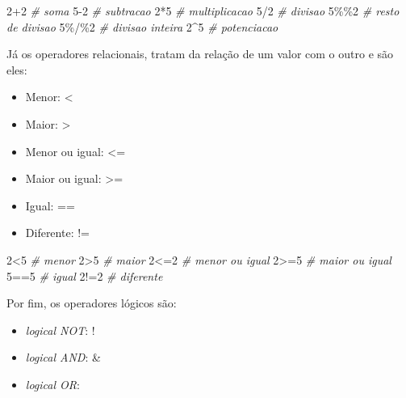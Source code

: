 \documentclass[
]{book}
\newenvironment{Shaded}{\begin{snugshade}}{\end{snugshade}}
\newcommand{\CommentTok}[1]{\textcolor[rgb]{0.56,0.35,0.01}{\textit{#1}}}
\newcommand{\DecValTok}[1]{\textcolor[rgb]{0.00,0.00,0.81}{#1}}
\newcommand{\SpecialCharTok}[1]{\textcolor[rgb]{0.00,0.00,0.00}{#1}}
\providecommand{\tightlist}{%
  \setlength{\itemsep}{0pt}\setlength{\parskip}{0pt}}
\theoremstyle{definition}
\theoremstyle{definition}
\theoremstyle{definition}
\theoremstyle{definition}
\theoremstyle{remark}
\begin{document}
\begin{Shaded}
\begin{Highlighting}[]
\DecValTok{2}\SpecialCharTok{+}\DecValTok{2}   \CommentTok{\# soma}
\DecValTok{5{-}2}   \CommentTok{\# subtracao}
\DecValTok{2}\SpecialCharTok{*}\DecValTok{5}   \CommentTok{\# multiplicacao}
\DecValTok{5}\SpecialCharTok{/}\DecValTok{2}   \CommentTok{\# divisao}
\DecValTok{5}\SpecialCharTok{\%\%}\DecValTok{2}  \CommentTok{\# resto de divisao}
\DecValTok{5}\SpecialCharTok{\%/\%}\DecValTok{2} \CommentTok{\# divisao inteira}
\DecValTok{2}\SpecialCharTok{\^{}}\DecValTok{5}   \CommentTok{\# potenciacao}
\end{Highlighting}
\end{Shaded}

Já os operadores relacionais, tratam da relação de um valor com o outro e são eles:

\begin{itemize}
\tightlist
\item
  Menor: \textless{}
\item
  Maior: \textgreater{}
\item
  Menor ou igual: \textless=
\item
  Maior ou igual: \textgreater=
\item
  Igual: ==
\item
  Diferente: !=
\end{itemize}

\begin{Shaded}
\begin{Highlighting}[]
\DecValTok{2}\SpecialCharTok{\textless{}}\DecValTok{5} \CommentTok{\# menor}
\DecValTok{2}\SpecialCharTok{\textgreater{}}\DecValTok{5} \CommentTok{\# maior}
\DecValTok{2}\SpecialCharTok{\textless{}=}\DecValTok{2} \CommentTok{\# menor ou igual}
\DecValTok{2}\SpecialCharTok{\textgreater{}=}\DecValTok{5} \CommentTok{\# maior ou igual}
\DecValTok{5}\SpecialCharTok{==}\DecValTok{5} \CommentTok{\# igual}
\DecValTok{2}\SpecialCharTok{!=}\DecValTok{2} \CommentTok{\# diferente}
\end{Highlighting}
\end{Shaded}

Por fim, os operadores lógicos são:

\begin{itemize}
\tightlist
\item
  \emph{logical NOT}: !
\item
  \emph{logical AND}: \&
\item
  \emph{logical OR}: \textbar{}
\end{itemize}
\end{document}
